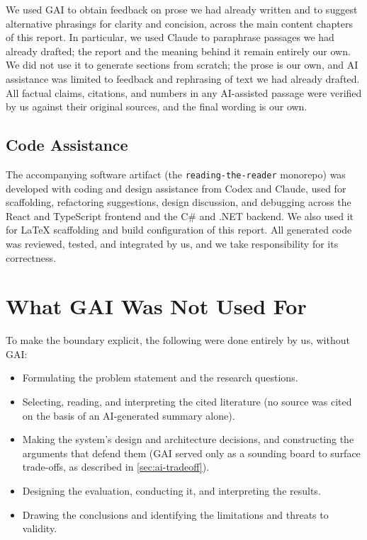 We used GAI to obtain feedback on prose we had already written and to suggest alternative phrasings for clarity and concision, across the main content chapters of this report.
In particular, we used Claude to paraphrase passages we had already drafted; the report and the meaning behind it remain entirely our own.
We did not use it to generate sections from scratch; the prose is our own, and AI assistance was limited to feedback and rephrasing of text we had already drafted.
All factual claims, citations, and numbers in any AI-assisted passage were verified by us against their original sources, and the final wording is our own.

\subsection{Code Assistance}

The accompanying software artifact (the \texttt{reading-the-reader} monorepo) was developed with coding and design assistance from Codex and Claude, used for scaffolding, refactoring suggestions, design discussion, and debugging across the React and TypeScript frontend and the C\# and .NET backend.
We also used it for LaTeX scaffolding and build configuration of this report.
All generated code was reviewed, tested, and integrated by us, and we take responsibility for its correctness.

\section{What GAI Was Not Used For}

To make the boundary explicit, the following were done entirely by us, without GAI:

\begin{itemize}
    \item Formulating the problem statement and the research questions.
    \item Selecting, reading, and interpreting the cited literature (no source was cited on the basis of an AI-generated summary alone).
    \item Making the system's design and architecture decisions, and constructing the arguments that defend them (GAI served only as a sounding board to surface trade-offs, as described in \cref{sec:ai-tradeoff}).
    \item Designing the evaluation, conducting it, and interpreting the results.
    \item Drawing the conclusions and identifying the limitations and threats to validity.
\end{itemize}

